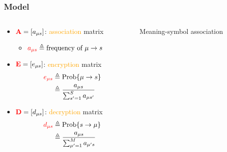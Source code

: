 \documentclass{beamer}
\newcommand{\hbDefined}[1]{\textcolor{red}{{#1}}}
\newcommand{\hbEmph}[1]{\textcolor{orange}{#1}}
\newcommand{\hbVec}[1]{\mathbf{#1}}
\theoremstyle{plain}
\theoremstyle{definition}
\theoremstyle{remark}
\begin{document}
\begin{frame}\frametitle{Model}
	\begin{columns}[T]
	\begin{column}{.6\linewidth}
		\begin{itemize}

			\item 
			$\hbDefined{\hbVec{A}} = [ a_{\mu s}]$: \hbEmph{association} matrix
			\begin{itemize}
				\item 
				$
				\hbDefined{a_{\mu s}} 
				\triangleq \text{frequency of }\mu \to s
				$
			\end{itemize}

			\item 
			$\hbDefined{\hbVec{E}} = [ e_{\mu s}]$: \hbEmph{encryption} matrix
			{\small 
				\begin{align*}
					\hbDefined{e_{\mu s}} 
					&\triangleq \text{Prob}\{\mu \to s\}\\ 
					&\triangleq \frac{a_{\mu s}}{\sum_{s'=1}^{S} a_{\mu s'}}
				\end{align*}				
			}

			\item 
			$\hbDefined{\hbVec{D}} = [ d_{\mu s}]$: \hbEmph{decryption} matrix
			{\small 
				\begin{align*}
					\hbDefined{d_{\mu s}} 
					&\triangleq \text{Prob}\{s \to \mu\}\\
					&\triangleq \frac{a_{\mu s}}{\sum_{\mu'=1}^{M} a_{\mu' s}}
				\end{align*}
			}
		\end{itemize}
		
	\end{column}
	\begin{column}{.5\linewidth}
		Meaning-symbol association\\


\end{column}
\end{columns}
\end{frame}
\end{document}
